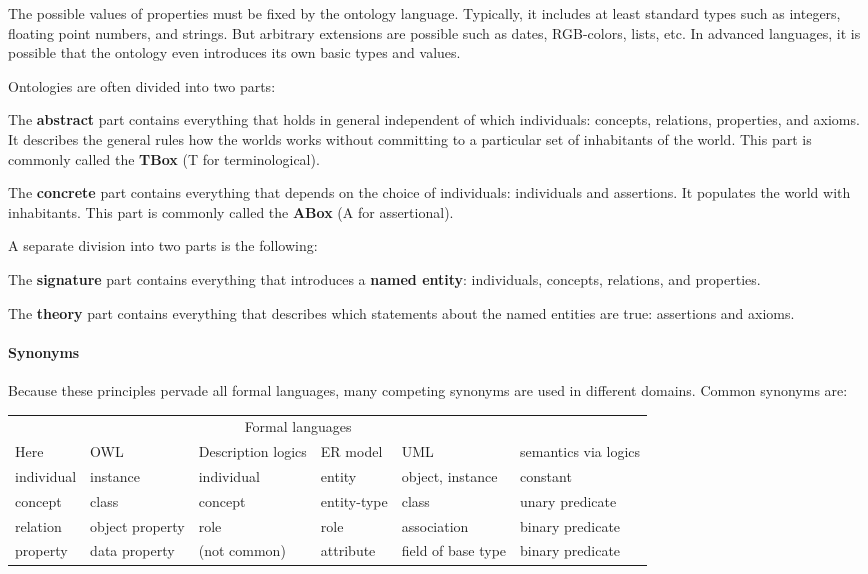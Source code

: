 The possible values of properties must be fixed by the ontology language.
Typically, it includes at least standard types such as integers, floating point numbers, and strings.
But arbitrary extensions are possible such as dates, RGB-colors, lists, etc.
In advanced languages, it is possible that the ontology even introduces its own basic types and values.

Ontologies are often divided into two parts:
\begin{compactitem}
 \item The \textbf{abstract} part contains everything that holds in general independent of which individuals: concepts, relations, properties, and axioms.
 It describes the general rules how the worlds works without committing to a particular set of inhabitants of the world.
 This part is commonly called the \textbf{TBox} (T for terminological).
 \item The \textbf{concrete} part contains everything that depends on the choice of individuals: individuals and assertions.
 It populates the world with inhabitants.
 This part is commonly called the \textbf{ABox} (A for assertional).
\end{compactitem}

A separate division into two parts is the following:
\begin{compactitem}
 \item The \textbf{signature} part contains everything that introduces a \textbf{named entity}: individuals, concepts, relations, and properties.
 \item The \textbf{theory} part contains everything that describes which statements about the named entities are true: assertions and axioms.
\end{compactitem}


\paragraph{Synonyms}
Because these principles pervade all formal languages, many competing synonyms are used in different domains.
Common synonyms are:
\begin{center}
\begin{tabular}{l@{\qquad}llll@{\qquad}l}
\toprule
	& \multicolumn{4}{c}{Formal languages} & \\
\cmidrule(r){2-5}
 Here       & OWL      & Description logics & ER model & UML & semantics via logics\\
\midrule
 individual & instance & individual & entity & object, instance & constant\\
 concept    & class    & concept &  entity-type & class & unary predicate\\
 relation   & object property & role & role & association & binary predicate \\
 property   & data property   & (not common) & attribute & field of base type & binary predicate\\
\bottomrule
\end{tabular}
\end{center}

